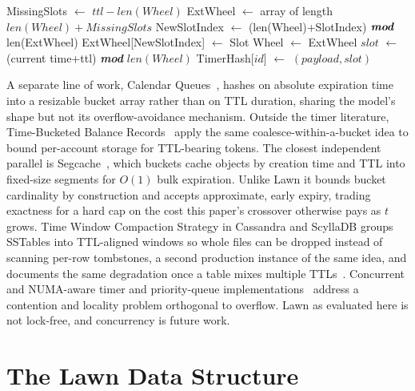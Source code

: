 \documentclass[conference]{IEEEtran}
\newcommand*\Let[2]{\State #1 $\gets$ #2}
\begin{document}
\begin{algorithm}
	\caption{Timer Wheel Resize (overflow)\label{alg:overflow_resize}}
	\begin{algorithmic}[1]
		\Let{MissingSlots}{$ttl-len(Wheel)$}
		\Let{ExtWheel}{array of length $len(Wheel) + MissingSlots$}
		\Let{NewSlotIndex}{(len(Wheel)+SlotIndex) $\textit{\textbf{mod}}$ len(ExtWheel) }
		\Let{ExtWheel[NewSlotIndex]}{Slot}
		\EndFor
		\Let{Wheel}{ExtWheel}
		\EndIf
		\Let{$slot$}{(current time+ttl) \textit{\textbf{mod}} $len(Wheel)$}
		\Let{TimerHash[$id$]}{$(payload,slot)$}
		\EndFunction
	\end{algorithmic}
\end{algorithm}

A separate line of work, Calendar Queues~\cite{CQ}, hashes on absolute expiration time into a resizable bucket array rather than on TTL duration, sharing the model's shape but not its overflow-avoidance mechanism. Outside the timer literature, Time-Bucketed Balance Records~\cite{TBBR} apply the same coalesce-within-a-bucket idea to bound per-account storage for TTL-bearing tokens. The closest independent parallel is Segcache~\cite{Segcache}, which buckets cache objects by creation time and TTL into fixed-size segments for $O(1)$ bulk expiration. Unlike Lawn it bounds bucket cardinality by construction and accepts approximate, early expiry, trading exactness for a hard cap on the cost this paper's crossover otherwise pays as $t$ grows. Time Window Compaction Strategy in Cassandra and ScyllaDB groups SSTables into TTL-aligned windows so whole files can be dropped instead of scanning per-row tombstones, a second production instance of the same idea, and documents the same degradation once a table mixes multiple TTLs~\cite{TWCS}. Concurrent and NUMA-aware timer and priority-queue implementations~\cite{largescale, autoscale, smartpq, numasched} address a contention and locality problem orthogonal to overflow. Lawn as evaluated here is not lock-free, and concurrency is future work.

\section{The Lawn Data Structure}
\end{document}
